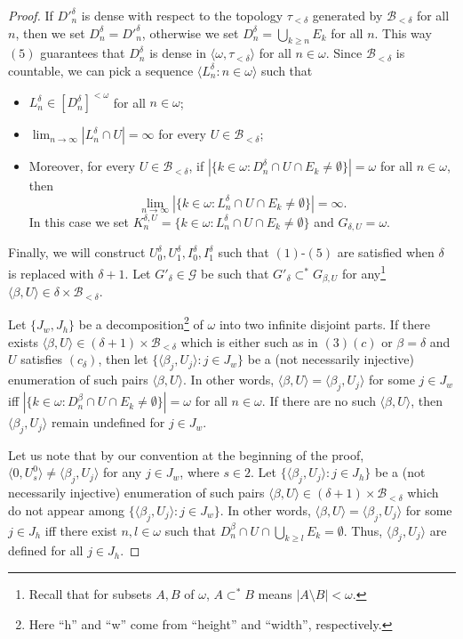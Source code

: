 \documentclass[12pt,a4paper]{amsart}
\theoremstyle{definition}
\newcommand{\w}{\omega}
\newcommand{\B}{\mathcal{B}}
\newcommand{\CG}{\mathcal{G}}
\newcommand{\la}{\langle}
\newcommand{\ra}{\rangle}
\begin{document}
\begin{proof}
If $D'^\delta_n$ is dense 
with respect to the topology $\tau_{<\delta}$
generated by $\B_{<\delta}$ for all $n$, then we set 
$D^\delta_n=D'^\delta_n$, otherwise we set $D^\delta_n=\bigcup_{k\geq n}E_k$ for all
$n$. This way $(5)$ guarantees that $D^\delta_n$ is dense in 
$\la \w,\tau_{<\delta}\ra$
for all $n\in\w$. 
Since $\B_{<\delta}$ is countable, we can pick a sequence $\la L^\delta_n:n\in\w\ra$ such that 
   \begin{itemize}
      \item[$(a_\delta)$] $L^\delta_n\in [D^\delta_n]^{<\w}$ for all $n\in\w$;
     \item[$(b_\delta)$] $\lim_{n\to\infty}|L^\delta_n\cap U|=\infty$
   for every $U\in\B_{<\delta}$;    
      \item[$(c_\delta)$] Moreover, for every  $U\in\B_{<\delta}$, if $|\{k\in\w:D^\delta_n\cap U\cap E_k\neq\emptyset\}|=\w$
      for all $n\in\w$, then 
   $$\lim_{n\to\infty}|\{k\in\w: L^\delta_n\cap U\cap E_k\neq\emptyset\}|=\infty.$$ In this case we set $K^{\delta,U}_n=\{k\in\w: L^\delta_n\cap U\cap E_k\neq\emptyset\}$ and $G_{\delta,U}=\w$.
\end{itemize}
Finally, we will construct $U^\delta_0,U^\delta_1,I^\delta_0,I^\delta_1$
such that $(1)$-$(5)$ are satisfied when $\delta$ is replaced with  $\delta+1$.  Let $G'_\delta\in\CG$ be such that 
      $G'_{\delta}\subset^* G_{\beta, U}$ for any\footnote{{Recall that for subsets $A,B$ of $\w$, $A\subset^*B$ means $|A\setminus B|<\w$. }} $\la\beta, U\ra\in\delta\times\B_{<\delta}$. 


{
Let $\{J_w,J_h\}$ be a decomposition\footnote{Here ``h'' and ``w'' come from ``height'' and ``width'', respectively.} of $\w$ into two infinite disjoint parts. 
If there exists 
$\la \beta,U\ra\in (\delta+1)\times\B_{<\delta}$ which  is either such as in $(3)(c)$ or $\beta=\delta$
 and $U$ satisfies $(c_\delta)$,  then 
 let $\{\la \beta_j,U_j\ra:j\in J_w\}$ be a (not necessarily injective) enumeration  of such pairs $\la \beta,U\ra$.  
 In other words,
$\la\beta,U\ra=\la\beta_j,U_j\ra$ for some $j\in J_w$
 iff 
$|\{k\in\w:D^\beta_n\cap U\cap E_k\neq\emptyset\}|=\w$
      for all $n\in\w$. If there are no such  $\la\beta,U\ra$, then 
      $\la\beta_j,U_j\ra$ remain undefined for $j\in J_w$.}

{Let us note that by our convention at the beginning of the proof, $\la 0, U^0_s\ra\neq \la\beta_j,U_j\ra$ for any $j\in J_w$, where $s\in 2$.  Let $\{\la \beta_j,U_j\ra:j\in J_h\}$ be a (not necessarily injective) enumeration  of such pairs $\la \beta,U\ra\in (\delta+1)\times\B_{<\delta} $ which do not appear among $\{\la \beta_j,U_j\ra:j\in J_w\}$.  
 In other words,
$\la\beta,U\ra=\la\beta_j,U_j\ra$ for some $j\in J_h$
 iff there exist $n,l\in\w$ such that 
$D^\beta_n\cap U\cap \bigcup_{k\geq l}E_k =\emptyset. $
 Thus, $\la \beta_j,U_j\ra$ are defined for all $j\in J_h$.}


\end{proof}
\end{document}
